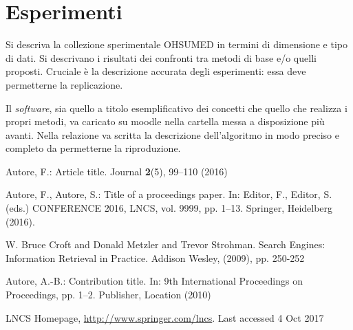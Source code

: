 \documentclass[runningheads]{llncs}
\begin{document}
\section{Esperimenti}
\label{sec:esperimenti}

Si descriva la collezione sperimentale OHSUMED in termini di
dimensione e tipo di dati.  Si descrivano i risultati dei confronti
tra metodi di base e/o quelli proposti.  Cruciale \`e la descrizione
accurata degli esperimenti: essa deve permetterne la replicazione.

Il \textit{software}, sia quello a titolo esemplificativo dei concetti
che quello che realizza i propri metodi, va caricato su moodle nella
cartella messa a disposizione pi\`u avanti.  Nella relazione va
scritta la descrizione dell'algoritmo in modo preciso e completo da
permetterne la riproduzione.

\begin{thebibliography}{8}
Autore, F.: Article title. Journal \textbf{2}(5), 99--110 (2016)

Autore, F., Autore, S.: Title of a proceedings paper. In: Editor,
F., Editor, S. (eds.) CONFERENCE 2016, LNCS, vol. 9999, pp. 1--13.
Springer, Heidelberg (2016). 

W. Bruce Croft and Donald Metzler and Trevor Strohman. Search Engines: Information Retrieval in Practice. Addison Wesley, (2009), pp. 250-252

Autore, A.-B.: Contribution title. In: 9th International Proceedings
on Proceedings, pp. 1--2. Publisher, Location (2010)

LNCS Homepage, \url{http://www.springer.com/lncs}. Last accessed 4
Oct 2017
\end{thebibliography}

\begin{figure}[h!]
\end{figure}
\end{document}
